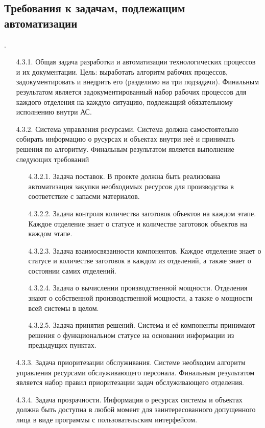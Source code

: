 \documentclass[16pt,a4paper]{article}
\begin{document}
\subsection{Требования к задачам, подлежащим автоматизации}.
\begin{itemize}
    \item [4.3.1.] Общая задача разработки и автоматизации технологических процессов и их документации. Цель: выработать алгоритм рабочих процессов, задокументировать и внедрить его (разделимо на три подзадачи). Финальным результатом является задокументированный набор рабочих процессов для каждого отделения на каждую ситуацию, подлежащий обязательному исполнению внутри АС.
    \item [4.3.2.] \label{sec:4.3.2.}Система управления ресурсами. Система должна самостоятельно собирать информацию о русурсах и объектах внутри неё и принимать решения по алгоритму. Финальным результатом является выполнение следующих требований
    \begin{enumerate}
        \item [4.3.2.1. ]Задача поставок. В проекте должна быть реализована автоматизация закупки необходимых ресурсов для производства в соответствие с запасми материалов.
        \item [4.3.2.2. ]Задача контроля количества заготовок объектов на каждом этапе. Каждое отделение знает о статусе и количестве заготовок объектов на каждом этапе.
        \item [4.3.2.3. ]Задача взаимосвязанности компонентов. Каждое отделение знает о статусе и количестве заготовок в каждом из отделений, а также знает о состоянии самих отделений.
        \item [4.3.2.4. ] Задача о вычислении производственной мощности. Отделения знают о собственной производственной мощности, а также о мощности всей системы в целом.
        \item [4.3.2.5. ] Задача принятия решений. Система и её компоненты принимают решения о функциональном статусе на основании информации из предыдущих пунктах.
    \end{enumerate}
    \item [4.3.3.] Задача приоритезации обслуживания. Системе необходим алгоритм управления ресурсами обслуживающего персонала. Финальным результатом является набор правил приоритезации задач обслуживающего отделения.
    \item [4.3.4.] Задача прозрачности. Информация о ресурсах системы и объектах должна быть доступна в любой момент для заинтересованного допущенного лица в виде программы с пользовательским интерфейсом.

\end{itemize}
\end{document}
